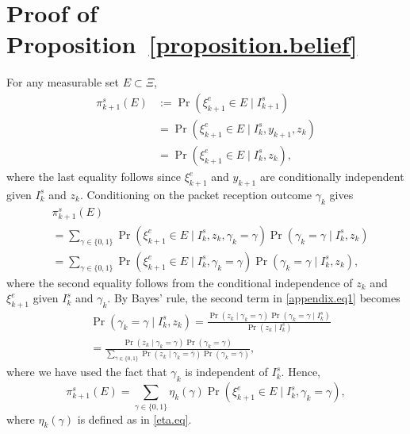 \documentclass[letterpaper, 10 pt, conference]{ieeeconf}
\begin{document}
\section{Proof of Proposition~\ref{proposition.belief}}\label{appendix.b}
For any measurable set $E\subset \Xi$,
\begin{align*}
    \pi_{k+1}^s(E)&:=\operatorname{Pr}(\xi_{k+1}^e\in E\mid I_{k+1}^s)\\
    &=\operatorname{Pr}(\xi_{k+1}^e\in E\mid I_{k}^s, y_{k+1},z_k)\\
    &=\operatorname{Pr}(\xi_{k+1}^e\in E\mid I_{k}^s,z_k),
\end{align*}
where the last equality follows since $\xi_{k+1}^e$  and $y_{k+1}$ are conditionally independent given $I_k^s$ and $z_k$. Conditioning on the packet reception outcome $\gamma_k$ gives 
\begin{align}\label{appendix.eq1}
    &\pi_{k+1}^s(E)\\
    &= \sum_{\gamma\in \{0,1\}} \operatorname{Pr}(\xi_{k+1}^e\in E\mid I_k^s,z_k,\gamma_k=\gamma)\operatorname{Pr}(\gamma_k=\gamma\mid I_k^s,z_k)\nonumber\\
    &= \sum_{\gamma\in \{0,1\}} \operatorname{Pr}(\xi_{k+1}^e\in E\mid I_k^s,\gamma_k=\gamma)\operatorname{Pr}(\gamma_k=\gamma\mid I_k^s,z_k),\nonumber
\end{align}
where the second equality follows from the conditional independence of $z_k$ and $\xi^e_{k+1}$ given $I_k^s$ and $\gamma_k$. By Bayes' rule, the second term in \eqref{appendix.eq1} becomes 
\begin{align*}
    &\operatorname{Pr}(\gamma_k=\gamma\mid I_k^s,z_k) = \frac{\operatorname{Pr}(z_k\mid \gamma_k=\gamma)\operatorname{Pr}(\gamma_k=\gamma\mid I_k^s)}{\operatorname{Pr}(z_k\mid I_k^s)}\\
    & =\frac{\operatorname{Pr}(z_k\mid \gamma_k=\gamma)\operatorname{Pr}(\gamma_k=\gamma)}{\sum_{\bar{\gamma}\in \{0,1\}}\operatorname{Pr}(z_k\mid \gamma_k=\bar{\gamma})\operatorname{Pr}(\gamma_k=\bar{\gamma})},
\end{align*}
where we have used the fact that $\gamma_k$ is independent of $I_k^s$. Hence,
\begin{equation}\label{appendix.eq2}
    \pi^s_{k+1}(E)=\sum_{\gamma\in \{0,1\}} \eta_k(\gamma)\operatorname{Pr}(\xi_{k+1}^e\in E\mid I_k^s,\gamma_k=\gamma),
\end{equation}
where $\eta_k(\gamma)$ is defined as in \eqref{eta.eq}.
\end{document}
